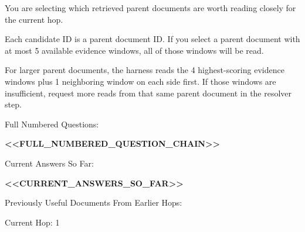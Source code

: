 \begin{tcolorbox}[colback=white, colframe=my-green, coltitle=black, parskip=5mm, title=\textbf{Document Choose}, halign=flush left, enhanced, breakable, skin first=enhanced, skin middle=enhanced, skin last=enhanced]
\begin{scriptsize}
\ttfamily
\setlength{\parindent}{0pt}
You are selecting which retrieved parent documents are worth reading closely for the current hop.\par
Each candidate ID is a parent document ID. If you select a parent document with at most 5 available evidence windows, all of those windows will be read.\par
For larger parent documents, the harness reads the 4 highest-scoring evidence windows plus 1 neighboring window on each side first. If those windows are insufficient, request more reads from that same parent document in the resolver step.\par
\mbox{}\par
Full Numbered Questions:\par
\textcolor{my-green}{\textbf{\textless{}\textless{}FULL\_NUMBERED\_QUESTION\_CHAIN\textgreater{}\textgreater{}}}\par
\mbox{}\par
Current Answers So Far:\par
\textcolor{my-green}{\textbf{\textless{}\textless{}CURRENT\_ANSWERS\_SO\_FAR\textgreater{}\textgreater{}}}\par
\mbox{}\par
Previously Useful Documents From Earlier Hops:\par
[\par
  \{\par
    "doc\_id": "\textcolor{my-green}{\textbf{\textless{}\textless{}PREVIOUSLY\_USEFUL\_DOC\_ID\textgreater{}\textgreater{}}}",\par
    "title": "\textcolor{my-green}{\textbf{\textless{}\textless{}PREVIOUSLY\_USEFUL\_DOCUMENT\_TITLE\textgreater{}\textgreater{}}}",\par
    "source": "\textcolor{my-green}{\textbf{\textless{}\textless{}SOURCE\_KIND\textgreater{}\textgreater{}}}",\par
    "why\_useful": "\textcolor{my-green}{\textbf{\textless{}\textless{}WHY\_THIS\_DOCUMENT\_HELPED\_EARLIER\textgreater{}\textgreater{}}}"\par
  \}\par
]\par
\mbox{}\par
Current Hop: 1\par

\end{scriptsize}
\end{tcolorbox}
